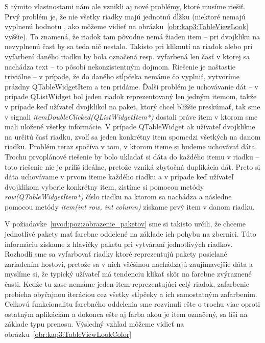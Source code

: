 S týmito vlastnosťami nám ale vznikli aj nové problémy, ktoré musíme riešiť. Prvý problém je, že nie všetky riadky majú jednotnú dĺžku (niektoré nemajú vyplnenú hodnotu , ako môžeme vidieť na obrázku~\ref{obr:kap3:TableViewLook} vyššie). To znamená, že riadok tam pôvodne nemá žiaden item -- pri dvojkliku na nevyplnenú časť by sa teda nič nestalo. Takisto pri kliknutí na riadok alebo pri vyfarbení daného riadku by bola označená resp. vyfarbená len časť v ktorej sa nachádza text -- to pôsobí nekonzistentným dojmom. Riešenie je naštastie triviálne -- v prípade, že do daného stĺpčeka nemáme čo vyplniť, vytvoríme prázdny QTableWidgetItem a ten pridáme. Ďalší problém je uchovávanie dát -- v prípade QListWidget bol jeden riadok reprezentovaný len jedným itemom, takže v prípade keď užívateľ dvojklikol na paket, ktorý chcel bližšie preskúmať, tak sme v signali \textit{itemDoubleClicked(QListWidgetItem*)} dostali práve item v ktorom sme mali uložené všetky informácie. V prípade QTableWidget ak užívateľ dvojklikne na určitú časť riadku, zvolí sa jeden konkrétny item spomedzi všetkých na danom riadku. Problém teraz spočíva v tom, v ktorom iteme si budeme uchovávať dáta. Trochu prvoplánové riešenie by bolo ukladať si dáta do každého itemu v riadku -- toto riešenie nie je príliš ideálne, pretože vzniká zbytočná duplikácia dát. Preto si dáta uchovávame v prvom iteme každého riadku a v prípade keď užívateľ dvojklikom vyberie konkrétny item, zistíme si pomocou metódy \textit{row(QTableWidgetItem*)} číslo riadku na ktorom sa nachádza a následne pomocou metódy \textit{item(int row, int column)} získame prvý item v danom riadku.

V požiadavke~\ref{uvod:poz:zobrazenie_paketov} sme si takisto určili, že chceme jednotlivé pakety mať farebne oddelené na základe ich pohybu na zbernici. Túto informáciu získame z hlavičky paketu pri vytváraní jednotlivých riadkov. Rozhodli sme sa vyfarbovať riadky ktoré reprezentujú pakety posielané zariadením hostovi, pretože sa v nich väčšinou nachádzajú zaujímavejšie dáta a myslíme si, že typický užívateľ má tendenciu klikať skôr na farebne zvýraznené časti. Keďže tu zase nemáme jeden item reprezentujúci celý riadok, zafarbenie prebieha obyčajnou iteráciou cez všetky stĺpčeky a ich samostatným zafarbením. Celkovú funkcionalitu farebného oddelenia sme rozvinuli ešte o trochu viac oproti ostatným aplikáciám a dokonca ešte aj farba akou je item označený, sa líši na základe typu prenosu. Výsledný vzhľad môžeme vidieť na obrázku~\ref{obr:kap3:TableViewLookColor}

